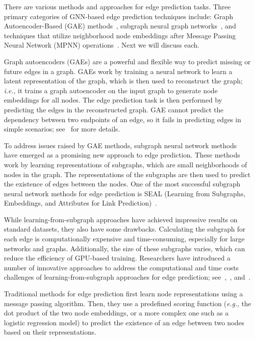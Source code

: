 \documentclass{article}
\begin{document}
There are various methods and approaches for edge prediction tasks. Three primary categories of GNN-based edge prediction techniques include: Graph Autoencoder-Based (GAE) methods~\cite{kipf2016variational}, subgraph neural graph networks~\cite{zhang2018link}, and techniques that utilize neighborhood node embeddings after Message Passing Neural Network (MPNN) operations~\cite{gilmer2017neural}. Next we will discuss each.


Graph autoencoders (GAEs) are a powerful and flexible way to predict missing or future edges in a graph. GAEs work by training a neural network to learn a latent representation of the graph, which is then used to reconstruct the graph; \emph{i.e.,} it trains a graph autoencoder on the input graph to generate node embeddings for all nodes. The edge prediction task is then performed by predicting the edges in the reconstructed graph.
GAE cannot predict the dependency between two endpoints of an edge, so it fails in predicting edges in simple scenarios; see~\cite{zhang2021labeling} for more details.

To address issues raised by GAE methods, subgraph neural network methods have emerged as a promising new approach to edge prediction. These methods work by learning representations of subgraphs, which are small neighborhoods of nodes in the graph. The representations of the subgraphs are then used to predict the existence of edges between the nodes. One of the most successful subgraph neural network methods for edge prediction is SEAL (Learning from Subgraphs, Embeddings, and Attributes for Link Prediction)~\cite{zhang2018link}. 


While learning-from-subgraph approaches have achieved impressive results on standard datasets, they also have some drawbacks. Calculating the subgraph for each edge is computationally expensive and time-consuming, especially for large networks and graphs. Additionally, the size of these subgraphs varies, which can reduce the efficiency of GPU-based training.
Researchers have introduced a number of innovative approaches to address the computational and time costs challenges of learning-from-subgraph approaches for edge prediction; see~\cite{chamberlain2023graph},~\cite{yun2021neo}, and~\cite{wang2023neural}.


Traditional methods for edge prediction first learn node representations using a message passing algorithm. Then, they use a predefined scoring function (\emph{e.g.,} the dot product of the two node embeddings, or a more complex one such as a logistic regression model)  to predict the existence of an edge between two nodes based on their representations.
\end{document}
